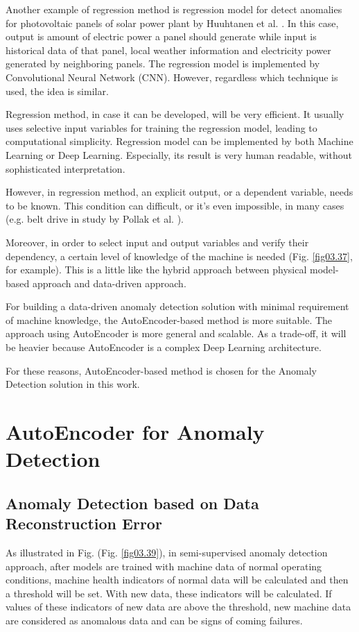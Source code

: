 Another example of regression method is regression model for detect anomalies for photovoltaic panels of solar power plant by Huuhtanen et al. \parencite{huuhtanen2018predictive}. In this case, output is amount of electric power a panel should generate while input is historical data of that panel, local weather information and electricity power generated by neighboring panels. The regression model is implemented by Convolutional Neural Network (CNN). However, regardless which technique is used, the idea is similar.

Regression method, in case it can be developed, will be very efficient. It usually uses selective input variables for training the regression model, leading to computational simplicity. Regression model can be implemented by both Machine Learning or Deep Learning. Especially, its result is very human readable, without sophisticated interpretation. 

However, in regression method, an explicit output, or a dependent variable, needs to be known. This condition can difficult, or it's even impossible, in many cases (e.g. belt drive in study by Pollak et al. \parencite{pollak2021prediction}).

Moreover, in order to select input and output variables and verify their dependency, a certain level of knowledge of the machine is needed (Fig. \ref{fig03.37}, for example). This is a little like the hybrid approach between physical model-based approach and data-driven approach.

For building a data-driven anomaly detection solution with minimal requirement of machine knowledge, the AutoEncoder-based method is more suitable. The approach using AutoEncoder is more general and scalable. As a trade-off, it will be heavier because AutoEncoder is a complex Deep Learning architecture.

For these reasons, AutoEncoder-based method is chosen for the Anomaly Detection solution in this work.


\section{AutoEncoder for Anomaly Detection} \label{part3.4}

\subsection{Anomaly Detection based on Data Reconstruction Error}

As illustrated in Fig. (Fig. \ref{fig03.39}), in semi-supervised anomaly detection approach, after models are trained with machine data of normal operating conditions, machine health indicators of normal data will be calculated and then a threshold will be set. With new data, these indicators will be calculated. If values of these indicators of new data are above the threshold, new machine data are considered as anomalous data and can be signs of coming failures.

